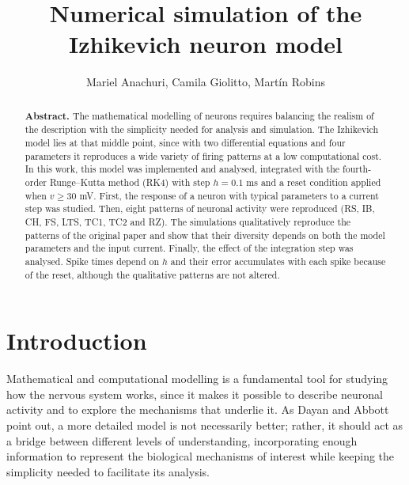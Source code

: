 \documentclass[aps,pre,twocolumn,10pt,nofootinbib,floatfix]{revtex4-2}
\begin{document}
\title{Numerical simulation of the Izhikevich neuron model}

\author{Mariel Anachuri, Camila Giolitto, Martín Robins}

\begin{abstract}
\textbf{Abstract.} The mathematical modelling of neurons requires balancing the realism of
the description with the simplicity needed for analysis and simulation. The Izhikevich model
lies at that middle point, since with two differential equations and four parameters it
reproduces a wide variety of firing patterns at a low computational cost. In this work, this
model was implemented and analysed, integrated with the fourth-order Runge--Kutta method (RK4)
with step $h = 0.1$ ms and a reset condition applied when $v \geq 30$ mV. First, the response
of a neuron with typical parameters to a current step was studied. Then, eight patterns of
neuronal activity were reproduced (RS, IB, CH, FS, LTS, TC1, TC2 and RZ). The simulations
qualitatively reproduce the patterns of the original paper and show that their diversity
depends on both the model parameters and the input current. Finally, the effect of the
integration step was analysed. Spike times depend on $h$ and their error accumulates with each
spike because of the reset, although the qualitative patterns are not altered.

\smallskip
{}
\end{abstract}

\maketitle

\section{Introduction}

Mathematical and computational modelling is a fundamental tool for studying how the nervous
system works, since it makes it possible to describe neuronal activity and to explore the
mechanisms that underlie it. As Dayan and Abbott~\cite{dayan2001} point out, a more detailed
model is not necessarily better; rather, it should act as a bridge between different levels
of understanding, incorporating enough information to represent the biological mechanisms of
interest while keeping the simplicity needed to facilitate its analysis.
\end{document}
